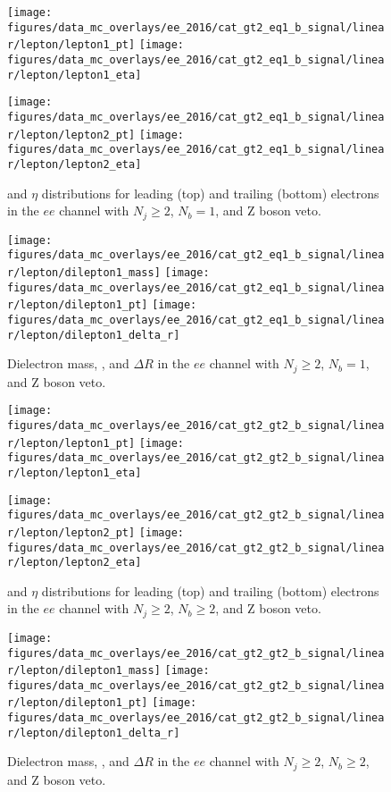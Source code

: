 \begin{figure}[htb!]
    \centering
    \texttt{[image: figures/data\_mc\_overlays/ee\_2016/cat\_gt2\_eq1\_b\_signal/linear/lepton/lepton1\_pt]}
    \texttt{[image: figures/data\_mc\_overlays/ee\_2016/cat\_gt2\_eq1\_b\_signal/linear/lepton/lepton1\_eta]}

    \texttt{[image: figures/data\_mc\_overlays/ee\_2016/cat\_gt2\_eq1\_b\_signal/linear/lepton/lepton2\_pt]}
    \texttt{[image: figures/data\_mc\_overlays/ee\_2016/cat\_gt2\_eq1\_b\_signal/linear/lepton/lepton2\_eta]}
    \caption{\pt and $\eta$ distributions for leading (top) and trailing
    (bottom) electrons in the $ee$ channel with $N_{j} \geq 2$, $N_{b}
    = 1$, and Z boson veto.}
    \label{fig:ee_1_kinematic}
\end{figure}

\begin{figure}[htb!]
    \centering
    \texttt{[image: figures/data\_mc\_overlays/ee\_2016/cat\_gt2\_eq1\_b\_signal/linear/lepton/dilepton1\_mass]}
    \texttt{[image: figures/data\_mc\_overlays/ee\_2016/cat\_gt2\_eq1\_b\_signal/linear/lepton/dilepton1\_pt]}
    \texttt{[image: figures/data\_mc\_overlays/ee\_2016/cat\_gt2\_eq1\_b\_signal/linear/lepton/dilepton1\_delta\_r]}
    \caption{Dielectron mass, \pt, and $\Delta R$ in the $ee$ channel
    with $N_{j} \geq 2$, $N_{b} = 1$, and Z boson veto.}
    \label{fig:ee_1_dilepton}
\end{figure}

\begin{figure}[htb!]
    \centering
    \texttt{[image: figures/data\_mc\_overlays/ee\_2016/cat\_gt2\_gt2\_b\_signal/linear/lepton/lepton1\_pt]}
    \texttt{[image: figures/data\_mc\_overlays/ee\_2016/cat\_gt2\_gt2\_b\_signal/linear/lepton/lepton1\_eta]}

    \texttt{[image: figures/data\_mc\_overlays/ee\_2016/cat\_gt2\_gt2\_b\_signal/linear/lepton/lepton2\_pt]}
    \texttt{[image: figures/data\_mc\_overlays/ee\_2016/cat\_gt2\_gt2\_b\_signal/linear/lepton/lepton2\_eta]}
    \caption{\pt and $\eta$ distributions for leading (top) and trailing
    (bottom) electrons in the $ee$ channel with $N_{j} \geq 2$, $N_{b}
    \geq 2$, and Z boson veto.}
    \label{fig:ee_2_kinematic}
\end{figure}

\begin{figure}[htb!]
    \centering
    \texttt{[image: figures/data\_mc\_overlays/ee\_2016/cat\_gt2\_gt2\_b\_signal/linear/lepton/dilepton1\_mass]}
    \texttt{[image: figures/data\_mc\_overlays/ee\_2016/cat\_gt2\_gt2\_b\_signal/linear/lepton/dilepton1\_pt]}
    \texttt{[image: figures/data\_mc\_overlays/ee\_2016/cat\_gt2\_gt2\_b\_signal/linear/lepton/dilepton1\_delta\_r]}
    \caption{Dielectron mass, \pt, and $\Delta R$ in the $ee$ channel
    with $N_{j} \geq 2$, $N_{b} \geq 2$, and Z boson veto.}
    \label{fig:ee_2_dilepton}
\end{figure}

